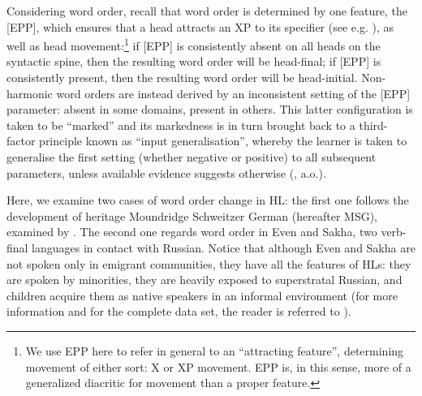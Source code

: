 \documentclass[output=paper]{langscibook}
\begin{document}
Considering word order, recall that word order is determined by one feature, the [EPP], which ensures that a head attracts an XP to its specifier (see e.g. \citealt{RobertsHolmberg2010}), as well as head movement:\footnote{We use EPP here to refer in general to an “attracting feature”, determining movement of either sort: X or XP movement. EPP is, in this sense, more of a generalized diacritic for movement than a proper feature.} if [EPP] is consistently absent on all heads on the syntactic spine, then the resulting word order will be head-final; if [EPP] is consistently present, then the resulting word order will be head-initial. Non-harmonic word orders are instead derived by an inconsistent setting of the [EPP] parameter: absent in some domains, present in others. This latter configuration is taken to be ``marked'' and its markedness is in turn brought back to a third-factor principle known as ``input generalisation'', whereby the learner is taken to generalise the first setting (whether negative or positive) to all subsequent parameters, unless available evidence suggests otherwise (\citealt{RobertsHolmberg2010}, a.o.).

Here, we examine two cases of word order change in HL: the first one follows the development of heritage Moundridge Schweitzer German (hereafter MSG), examined by \citet{HoppPutnam2015}. The second one regards word order in Even and Sakha, two verb-final languages in contact with Russian. Notice that although Even and Sakha are not spoken only in emigrant communities, they have all the features of HLs: they are spoken by minorities, they are heavily exposed to superstratal Russian, and children acquire them as native speakers in an informal environment (for more information and for the complete data set, the reader is referred to \citealt{GrenobleOsipov2023}).
\end{document}
